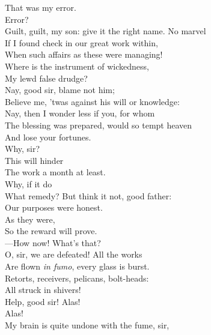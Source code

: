 \documentclass[a4paper,oneside,12pt]{memoir}
\begin{document}
\begin{drama*}
\mammonspeaks {} That was my error.\\
\subtlespeaks {} Error?\\
Guilt, guilt, my son: give it the right name. No marvel\\
If I found check in our great work within,\\
When such affairs as these were managing!\\
Where is the instrument of wickedness,\\
My lewd false drudge?\\
\mammonspeaks {} Nay, good sir, blame not him;\\
Believe me, 'twas against his will or knowledge:\\
\subtlespeaks Nay, then I wonder less if you, for whom\\
The blessing was prepared, would so tempt heaven\\
And lose your fortunes.\\
\mammonspeaks {} Why, sir?\\
\subtlespeaks {} This will hinder\\
The work a month at least.\\
\mammonspeaks {} Why, if it do\\
What remedy? But think it not, good father:\\
Our purposes were honest.\\
\subtlespeaks {} As they were,\\
So the reward will prove.\\
 ---How now! What's that?\\
\facespeaks O, sir, we are defeated! All the works\\
Are flown \emph{in fumo}, every glass is burst.\\
Retorts, receivers, pelicans, bolt-heads:\\
All struck in shivers!\\
 Help, good sir! Alas!\\
\mammonspeaks Alas!\\
\facespeaks {} My brain is quite undone with the fume, sir,\\

\end{drama*}
\end{document}
